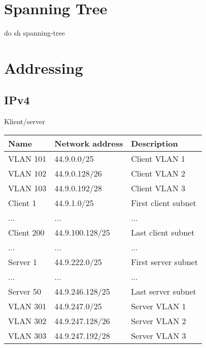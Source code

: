\documentclass[czech,master,dept460,male,cpp,cpdeclaration]{diploma}
\begin{document}
\newpage
\section{Spanning Tree}
\label{sec:Sec03}
\noindent do sh spanning-tree

\newpage
\section{Addressing}
\label{sec:Sec04}

\subsection{IPv4}
\label{subsec:Sec041}
\noindent Klient/server
\begin{center}
	\begin{tabular}{l|l|l}
		Name & Network address & Description \\
		\hline
		VLAN 101 & 44.9.0.0/25 & Client VLAN 1\\
		VLAN 102 & 44.9.0.128/26 & Client VLAN 2\\
		VLAN 103 & 44.9.0.192/28 & Client VLAN 3\\
		Client 1 & 44.9.1.0/25 & First client subnet\\
		... & ... & ...\\
		Client 200 & 44.9.100.128/25 & Last client subnet\\
		... & ... & ...\\
		Server 1 & 44.9.222.0/25 & First server subnet\\
		... & ... & ...\\
		Server 50 & 44.9.246.128/25 & Last server subnet\\
		VLAN 301 & 44.9.247.0/25 & Server VLAN 1\\
		VLAN 302 & 44.9.247.128/26 & Server VLAN 2\\
		VLAN 303 & 44.9.247.192/28 & Server VLAN 3\\
	\end{tabular}
\end{center}
\end{document}

